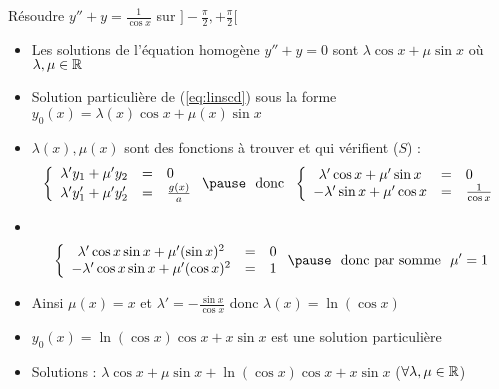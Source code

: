 \begin{frame}
\begin{exemple}
Résoudre $y'' + y = \frac{1}{\cos x}$ sur $]-\frac\pi2,+\frac\pi2[$ 
\pause

\begin{itemize}
  \item Les solutions de l'équation homogène $y'' + y =0$ sont
$\lambda \cos x  + \mu \sin x$ où $\lambda,\mu\in\mathbb{R}$
\pause  
  \item Solution particulière de (\ref{eq:linscd}) sous la forme $y_0(x) =\lambda(x) \cos x  + \mu(x) \sin x$
\pause  
  \item $\lambda(x),\mu(x)$ sont des fonctions à trouver et qui vérifient ($S$) :
  \vspace*{-1.5ex}  
\pause$$
\left\{\begin{array}{ccl}  
\lambda'y_1+\mu'y_2&=&0\\ 
\lambda'y'_1+\mu'y'_2&=& \frac{g(x)}{a}
\end{array}\right. 
\pause  \ \text{ donc } \ 
\left\{\begin{array}{ccl}  
\lambda' \cos x + \mu' \sin x &=&0\\ 
-\lambda' \sin x + \mu' \cos x &=& \frac{1}{\cos x}
\end{array}\right. 
$$

\pause\vspace*{-3ex}

  
  \item  ~ \vspace*{-4ex}
$$
\left\{\begin{array}{ccl}  
\lambda' \cos x \sin x + \mu' (\sin x)^2 &=&0\\ 
-\lambda' \cos x \sin x + \mu' (\cos x)^2 &=& 1
\end{array}\right.  
\pause  \  \text{ donc par somme } \ 
\mu'=1
$$

 \pause  \vspace*{-3ex}
 
  \item Ainsi $\mu(x) = x$ et $\lambda' = -\frac{\sin x}{\cos x}$ donc $\lambda(x) = \ln(\cos x)$
 
 \pause  
  \item $y_0(x) = \ln(\cos x) \cos x + x\sin x$ est une solution particulière  
  
  \pause  
  \item Solutions :
$\lambda \cos x  + \mu \sin x + \ln(\cos x) \cos x + x\sin x$
($\forall \lambda,\mu\in \mathbb{R}$)
\end{itemize}
 
\end{exemple}

\end{frame}




